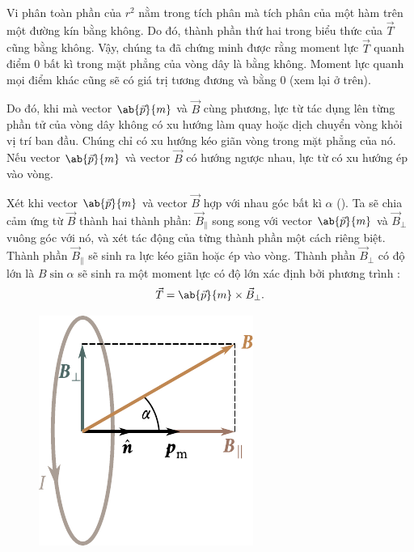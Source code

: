 \noindent
Vi phân toàn phần của $r^2$ nằm trong tích phân mà tích phân của một hàm trên một đường kín bằng không. Do đó, thành phần thứ hai trong biểu thức của $\vec{T}$ cũng bằng không. Vậy, chúng ta đã chứng minh được rằng moment lực $\vec{T}$ quanh điểm $0$ bất kì trong mặt phẳng của vòng dây là bằng không. Moment lực quanh mọi điểm khác cũng sẽ có giá trị tương đương và bằng 0 (xem lại ở trên).

Do đó, khi mà vector $\ab{\vec{p}}{m}$ và $\vec{B}$ cùng phương, lực từ tác dụng lên từng phần tử của vòng dây không có xu hướng làm quay hoặc dịch chuyển vòng khỏi vị trí ban đầu. Chúng chỉ có xu hướng kéo giãn vòng trong mặt phẳng của nó. Nếu vector $\ab{\vec{p}}{m}$ và vector $\vec{B}$ có hướng ngược nhau, lực từ có xu hướng ép vào vòng.

Xét khi vector $\ab{\vec{p}}{m}$ và vector $\vec{B}$ hợp với nhau góc bất kì $\alpha$ (). Ta sẽ chia cảm ứng từ $\vec{B}$ thành hai thành phần: $\vec{B}_{\parallel}$  song song với vector $\ab{\vec{p}}{m}$ và $\vec{B}_{\perp}$  vuông góc với nó, và xét tác động của từng thành phần một cách riêng biệt. Thành phần $\vec{B}_{\parallel}$ sẽ sinh ra lực kéo giãn hoặc ép vào vòng. Thành phần $\vec{B}_{\perp}$ có độ lớn là $B\sin\alpha$ sẽ sinh ra một moment lực có độ lớn xác định bởi phương trình :
\begin{equation*}
    \vec{T} = \ab{\vec{p}}{m} \times \vec{B}_{\perp}.
\end{equation*}

\begin{figure}[t]
	\begin{center}
		\includegraphics[scale=1]{figures/ch_06/fig_6_16.pdf}
		\caption[]{}
		\label{fig:6_16}
	\end{center}
	\vspace{-0.8cm}
\end{figure}

